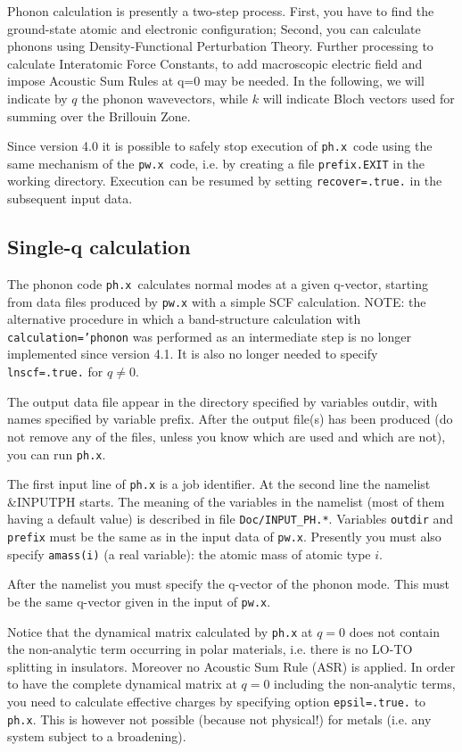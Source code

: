 \documentclass[12pt,a4paper]{article}
\def\pw.x{\texttt{pw.x}}
\def\ph.x{\texttt{ph.x}}
\begin{document}
Phonon calculation is presently a two-step process.
First, you have to find the ground-state atomic and electronic configuration;
Second, you can calculate phonons using Density-Functional Perturbation Theory.
Further processing to calculate Interatomic Force Constants, to add macroscopic
electric field and impose Acoustic Sum Rules at q=0 may be needed.
In the following, we will indicate by $q$ the phonon wavevectors, 
while $k$ will indicate Bloch vectors used for summing over the Brillouin Zone.

Since version 4.0 it is possible to safely stop execution of 
\ph.x\ code using
the same mechanism of the \pw.x\ code, i.e. by creating a file \texttt{prefix.EXIT} in the 
working directory. Execution can be resumed by setting \texttt{recover=.true.} 
in the subsequent input data.

\subsection{Single-q calculation}

The phonon code \ph.x\ calculates normal modes at a given q-vector, starting
from data files produced by \pw.x with a simple SCF calculation.
NOTE: the alternative procedure in which a band-structure calculation 
with \texttt{calculation='phonon} was performed as an intermediate step is no
longer implemented since version 4.1. It is also no longer needed to
specify \texttt{lnscf=.true.} for $q\ne 0$.

The output data file appear in the directory specified by variables outdir,
with names specified by variable prefix. After the output file(s) has been
produced (do not remove any of the files, unless you know which are used
and which are not), you can run \ph.x.
    
The first input line of \ph.x is a job identifier. At the second line the
namelist \&INPUTPH starts. The meaning of the variables in the namelist
(most of them having a default value) is described in file 
\texttt{Doc/INPUT\_PH.*}. Variables \texttt{outdir} and \texttt{prefix} 
must be the same as in the input data of \pw.x. Presently
you must also specify \texttt{amass(i)} (a real variable): the atomic mass 
of atomic type $i$.

After the namelist you must specify the q-vector of the phonon mode.
This must be the same q-vector given in the input of \pw.x.
    
Notice that the dynamical matrix calculated by \ph.x at $q=0$ does not
contain the non-analytic term occurring in polar materials, i.e. there is no
LO-TO splitting in insulators. Moreover no Acoustic Sum Rule (ASR) is
applied. In order to have the complete dynamical matrix at $q=0$ including
the non-analytic terms, you need to calculate effective charges by specifying
option \texttt{epsil=.true.} to \ph.x. This is however not possible (because
not physical!) for metals (i.e. any system subject to a broadening).
\end{document}
